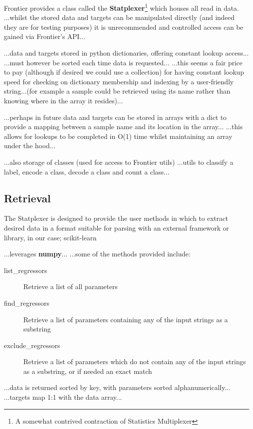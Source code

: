 Frontier provides a class called the \textbf{Statplexer}\footnote{A somewhat
contrived contraction of Statistics Multiplexer} which houses all read in data.
...whilst the stored data and targets can be manipulated directly (and indeed
they are for testing purposes) it is unrecommended and controlled access can be
gained via Frontier's API...

...data and targets stored in python dictionaries, offering constant lookup
access...
...must however be sorted each time data is requested...
...this seems a fair price to pay (although if desired we could use a
collection) for having constant lookup speed for checking on dictionary
membership and indexing by a user-friendly string...(for example a sample could
be retrieved using its name rather than knowing where in the array it
resides)...

...perhaps in future data and targets can be stored in arrays with a dict to
provide a mapping between a sample name and its location in the array...
...this allows for lookups to be completed in O(1) time whilst maintaining an
array under the hood...

...also storage of classes (used for access to Frontier utils)
...utils to classify a label, encode a class, decode a class and count a
class...


\subsection{Retrieval}
The Statplexer is designed to provide the user methods in which to extract
desired data in a format suitable for parsing with an external framework or
library, in our case; scikit-learn

...leverages \textbf{numpy}...
...some of the methods provided include:

\begin{description}
    \item[list\_regressors] Retrieve a list of all parameters
    \item[find\_regressors] Retrieve a list of parameters containing any of the
        input strings as a substring
    \item[exclude\_regressors] Retrieve a list of parameters which do not
        contain any of the input strings as a substring, or if needed an exact
        match
\end{description}

...data is returned sorted by key, with parameters sorted alphanumerically...
...targets map 1:1 with the data array...

